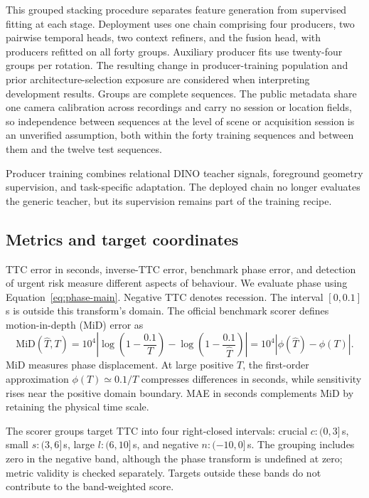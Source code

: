 This grouped stacking procedure \citep{wolpert1992} separates feature generation from supervised fitting at each stage. Deployment uses one chain comprising four producers, two pairwise temporal heads, two context refiners, and the fusion head, with producers refitted on all forty groups. Auxiliary producer fits use twenty-four groups per rotation. The resulting change in producer-training population and prior architecture-selection exposure are considered when interpreting development results. Groups are complete sequences. The public metadata share one camera calibration across recordings and carry no session or location fields, so independence between sequences at the level of scene or acquisition session is an unverified assumption, both within the forty training sequences and between them and the twelve test sequences.

Producer training combines relational DINO teacher signals, foreground geometry supervision, and task-specific adaptation. The deployed chain no longer evaluates the generic teacher, but its supervision remains part of the training recipe. 


\subsection{Metrics and target coordinates}
TTC error in seconds, inverse-TTC error, benchmark phase error, and detection of urgent risk measure different aspects of behaviour. We evaluate phase using Equation~\ref{eq:phase-main}. Negative TTC denotes recession. The interval $[0,0.1]$\,s is outside this transform's domain. The official benchmark scorer defines motion-in-depth (MiD) error as
\begin{equation}
 \mathrm{MiD}(\widehat T,T)=10^4\left|\log\left(1-\frac{0.1}{T}\right)
 -\log\left(1-\frac{0.1}{\widehat T}\right)\right|
 =10^4|\phi(\widehat T)-\phi(T)|.
\end{equation}
MiD measures phase displacement. At large positive $T$, the first-order approximation $\phi(T)\simeq0.1/T$ compresses differences in seconds, while sensitivity rises near the positive domain boundary. MAE in seconds complements MiD by retaining the physical time scale. 

The scorer groups target TTC into four right-closed intervals: crucial $c:(0,3]$\,s, small $s:(3,6]$\,s, large $l:(6,10]$\,s, and negative $n:(-10,0]$\,s. The grouping includes zero in the negative band, although the phase transform is undefined at zero; metric validity is checked separately. Targets outside these bands do not contribute to the band-weighted score.


